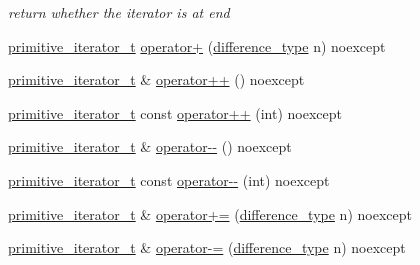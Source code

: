 \begin{DoxyCompactItemize}
\begin{DoxyCompactList}\small\item\em return whether the iterator is at end \end{DoxyCompactList}\item 
\mbox{\hyperlink{classnlohmann_1_1detail_1_1primitive__iterator__t}{primitive\+\_\+iterator\+\_\+t}} \mbox{\hyperlink{classnlohmann_1_1detail_1_1primitive__iterator__t_a00ce828d0fe58046c10e0445504df7bf}{operator+}} (\mbox{\hyperlink{classnlohmann_1_1detail_1_1primitive__iterator__t_af3db0d5c90de427d51645fe73a015553}{difference\+\_\+type}} n) noexcept
\item 
\mbox{\hyperlink{classnlohmann_1_1detail_1_1primitive__iterator__t}{primitive\+\_\+iterator\+\_\+t}} \& \mbox{\hyperlink{classnlohmann_1_1detail_1_1primitive__iterator__t_ad26511012fc88f3ec5d9e1cb708732fd}{operator++}} () noexcept
\item 
\mbox{\hyperlink{classnlohmann_1_1detail_1_1primitive__iterator__t}{primitive\+\_\+iterator\+\_\+t}} const \mbox{\hyperlink{classnlohmann_1_1detail_1_1primitive__iterator__t_aa011863621357b3cf891670bf63a48b1}{operator++}} (int) noexcept
\item 
\mbox{\hyperlink{classnlohmann_1_1detail_1_1primitive__iterator__t}{primitive\+\_\+iterator\+\_\+t}} \& \mbox{\hyperlink{classnlohmann_1_1detail_1_1primitive__iterator__t_abecbf0c73c7fe963a699738065177bc3}{operator-\/-\/}} () noexcept
\item 
\mbox{\hyperlink{classnlohmann_1_1detail_1_1primitive__iterator__t}{primitive\+\_\+iterator\+\_\+t}} const \mbox{\hyperlink{classnlohmann_1_1detail_1_1primitive__iterator__t_aef3b5dfeb2cb04dc9d0a024fc1898b98}{operator-\/-\/}} (int) noexcept
\item 
\mbox{\hyperlink{classnlohmann_1_1detail_1_1primitive__iterator__t}{primitive\+\_\+iterator\+\_\+t}} \& \mbox{\hyperlink{classnlohmann_1_1detail_1_1primitive__iterator__t_aee01535df0b3b40137d9241029a9a203}{operator+=}} (\mbox{\hyperlink{classnlohmann_1_1detail_1_1primitive__iterator__t_af3db0d5c90de427d51645fe73a015553}{difference\+\_\+type}} n) noexcept
\item 
\mbox{\hyperlink{classnlohmann_1_1detail_1_1primitive__iterator__t}{primitive\+\_\+iterator\+\_\+t}} \& \mbox{\hyperlink{classnlohmann_1_1detail_1_1primitive__iterator__t_a0bf83ab08abe1ae4b51c790c85cdf151}{operator-\/=}} (\mbox{\hyperlink{classnlohmann_1_1detail_1_1primitive__iterator__t_af3db0d5c90de427d51645fe73a015553}{difference\+\_\+type}} n) noexcept
\end{DoxyCompactItemize}
